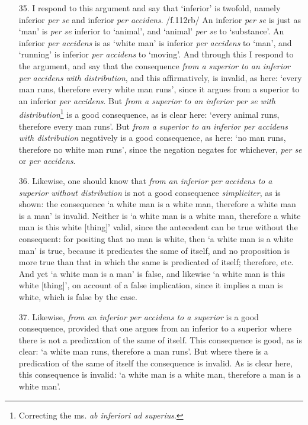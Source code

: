 \begin{enumerate}
\item[35.] I respond to this argument and say that `inferior' is twofold, namely inferior \textit{per se} and inferior \textit{per accidens}. /f.112rb/ An inferior \textit{per se} is just as `man' is \textit{per se} inferior to `animal', and `animal' \textit{per se} to `substance'. An inferior \textit{per accidens} is as `white man' is inferior \textit{per accidens} to `man', and `running' is inferior \textit{per accidens} to `moving'. And through this I respond to the argument, and say that the consequence \textit{from a superior to an inferior per accidens with distribution}, and this affirmatively, is invalid, as here: `every man runs, therefore every white man runs', since it argues from a superior to an inferior \textit{per accidens}. But \textit{from a superior to an inferior per se with distribution}\footnote{Correcting the ms. \textit{ab inferiori ad superius}.} is a good consequence, as is clear here: `every animal runs, therefore every man runs'. But \textit{from a superior to an inferior per accidens with distribution} negatively is a good consequence, as here: `no man runs, therefore no white man runs', since the negation negates for whichever, \textit{per se} or \textit{per accidens}. 
\item[36.] Likewise, one should know that \textit{from an inferior \textit{per accidens} to a superior without distribution} is not a good consequence \textit{simpliciter}, as is shown: the consequence `a white man is a white man, therefore a white man is a man' is invalid. Neither is `a white man is a white man, therefore a white man is this white [thing]' valid, since the antecedent can be true without the consequent: for positing that no man is white, then `a white man is a white man' is true, because it predicates the same of itself, and no proposition is more true than that in which the same is predicated of itself; therefore, etc. And yet `a white man is a man' is false, and likewise `a white man is this white [thing]', on account of a false implication, since it implies a man is white, which is false by the case.
\item[37.] Likewise, \textit{from an inferior per accidens to a superior} is a good consequence, provided that one argues from an inferior to a superior where there is not a predication of the same of itself. This consequence is good, as is clear: `a white man runs, therefore a man runs'. But where there is a predication of the same of itself the consequence is invalid. As is clear here, this consequence is invalid: `a white man is a white man, therefore a man is a white man'.
\end{enumerate}